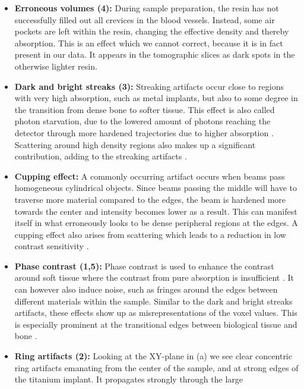 \begin{itemize}
	\item \textbf{Erroneous volumes (4):} During sample preparation, the
		resin has not successfully filled out all crevices in the blood
		vessels. Instead, some air pockets are left within the resin,
		changing the effective density and thereby absorption. This is
		an effect which we cannot correct, because it is in fact
		present in our data. It appears in the tomographic slices
		 as dark spots in the otherwise lighter resin. 
	\item \textbf{Dark and bright streaks (3):} Streaking artifacts occur
		close to regions with very high absorption, such as metal
		implants, but also to some degree in the transition from dense
		bone to softer tissue.  This effect is also called photon
		starvation, due to the lowered amount of photons reaching the
		detector through more hardened trajectories due to higher
		absorption \citep{srnoise}. Scattering around high density
		regions also makes up a significant contribution, adding to the
		streaking artifacts \citep{scatter_sr_ct}.
	\item \textbf{Cupping effect:} A commonly occurring artifact occurs
		when beams pass homogeneous cylindrical objects. Since beams
		passing the middle will have to traverse more material compared
		to the edges, the beam is hardened more towards the center and
		intensity becomes lower as a result. This can manifest itself
		in what erroneously looks to be dense peripheral regions at the
		edges. A cupping effect also arises from scattering which leads
		to a reduction in low contrast sensitivity
		\citep{srnoise}.
	\item \textbf{Phase contrast (1,5):} Phase contrast is used to enhance
		the contrast around soft tissue where the contrast from pure
		absorption is insufficient \citep{phasecontrast}. It can
		however also induce noise, such as fringes around the edges
		between different materials within the sample\citep{srnoise}.
		Similar to the dark and bright streaks artifacts, these effects
		show up as misrepresentations of the voxel values. This is
		especially prominent at the transitional edges between
		biological tissue and bone \citep{srnoise}.
	\item \textbf{Ring artifacts (2):} Looking at the XY-plane in
		(a) we see clear concentric ring artifacts
		emanating from the center of the sample, and at strong edges of
		the titanium implant. It propagates strongly through the large

\end{itemize}
